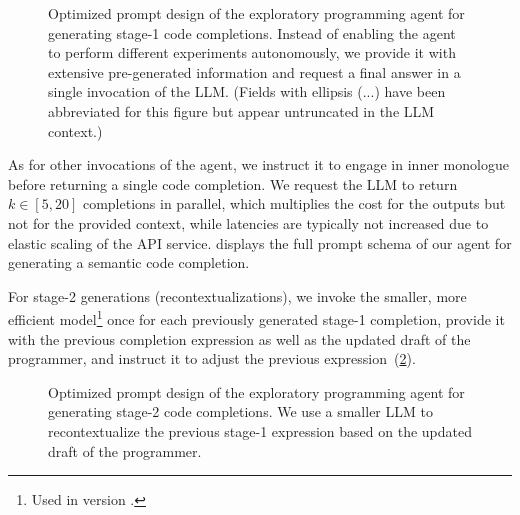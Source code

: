 \begin{figure}
	\centering
	\begin{threeparttable}
		\centering
		{\footnotesize
		}
	\end{threeparttable}
	\caption[Optimized prompt design of the exploratory programming agent for generating stage-1 code completions.]{
		Optimized prompt design of the exploratory programming agent for generating stage-1 code completions.
		Instead of enabling the agent to perform different experiments autonomously, we provide it with extensive pre-generated information and request a final answer in a single invocation of the LLM.
		(Fields with ellipsis (...) have been abbreviated for this figure but appear untruncated in the LLM context.)
	}
	\label{fig:agent/completions/prompt_design_1}
\end{figure}

As for other invocations of the agent, we instruct it to engage in inner monologue before returning a single code completion.
We request the LLM to return $k \in [5, 20]$ completions in parallel, which multiplies the cost for the outputs but not for the provided context, while latencies are typically not increased due to elastic scaling of the API service.
 displays the full prompt schema of our agent for generating a semantic code completion.

For stage-2 generations (recontextualizations), we invoke the smaller, more efficient \gptfouromini model\footnote{Used in version .} once for each previously generated stage-1 completion, provide it with the previous completion expression as well as the updated draft of the programmer, and instruct it to adjust the previous expression~(\cref{fig:agent/completions/prompt_design_2}).

\begin{figure}
	\centering
	\begin{threeparttable}
		\centering
		{\footnotesize
		\thimport{03_completions/prompt_design_2}}
	\end{threeparttable}
	\caption[Optimized prompt design of the exploratory programming agent for generating stage-2 code completions.]{
		Optimized prompt design of the exploratory programming agent for generating stage-2 code completions.
		We use a smaller LLM to recontextualize the previous stage-1 expression based on the updated draft of the programmer.
	}
	\label{fig:agent/completions/prompt_design_2}
\end{figure}
